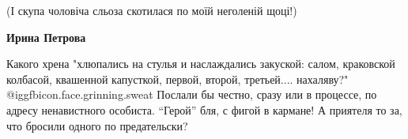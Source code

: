 \begin{itemize}
\begin{itemize}
\begin{itemize}
(І скупа чоловіча сльоза скотилася по моїй неголеній щоці!)


\textbf{Ирина Петрова} 

Какого хрена "хлюпались на стулья и наслаждались закуской: салом, краковской
колбасой, квашенной капусткой, первой, второй, третьей.... нахаляву?" @igg{fbicon.face.grinning.sweat}  Послали бы
честно, сразу или в процессе, по адресу ненавистного особиста. \enquote{Герой} бля, с
фигой в кармане! А приятеля то за, что бросили одного по предательски?

\end{itemize} %

\end{itemize} %


\end{itemize} %
